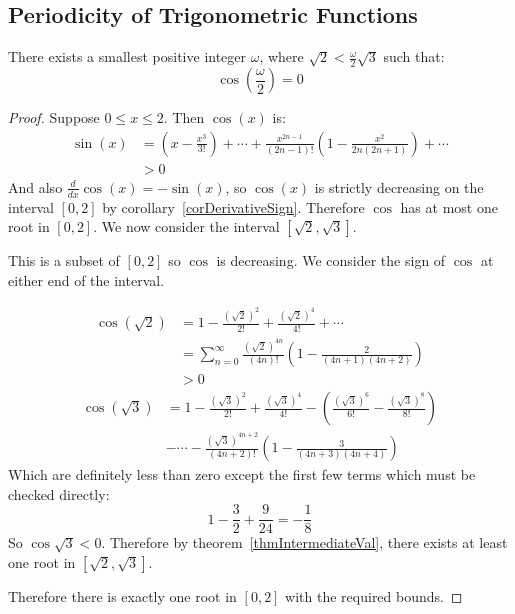 \documentclass[../Main.tex]{subfiles}
\begin{document}
\subsection{Periodicity of Trigonometric Functions}
\begin{lemma}
    There exists a smallest positive integer $\omega$, where $\sqrt{2} < \frac{\omega}{2} \sqrt{3}$ such that:
    \begin{equation*}
        \cos\left(\frac{\omega}{2}\right) = 0
    \end{equation*}
    \label{lemRootOfCos}
\end{lemma}
\begin{proof}
    Suppose $0 \leq x \leq 2$. Then $\cos(x)$ is:
    \begin{align*}
        \sin(x) &= \left(x - \frac{x^3}{3!}\right) + \cdots + \frac{x^{2n-1}}{(2n-1)!}\left(1 - \frac{x^2}{2n(2n+1)}\right) + \cdots \\
        &>0
    \end{align*}
    And also $\frac{d}{dx} \cos(x) = -\sin(x)$, so $\cos(x)$ is strictly decreasing on the interval $[0, 2]$ by corollary~\ref{corDerivativeSign}. Therefore $\cos$ has at most one root in $[0, 2]$. We now consider the interval $\left[\sqrt{2}, \sqrt{3}\right]$.\par
    This is a subset of $[0, 2]$ so $\cos$ is decreasing. We consider the sign of $\cos$ at either end of the interval.\par
    \begin{align*}
        \cos(\sqrt{2}) &= 1 - \frac{(\sqrt{2})^2}{2!} + \frac{(\sqrt{2})^4}{4!} + \cdots \\
        &= \sum_{n = 0}^\infty \frac{(\sqrt{2})^{4n}}{(4n)!}\left(1 - \frac{2}{(4n + 1)(4n + 2)}\right) \\
        &>0
    \end{align*}
    \begin{align*}
        \cos(\sqrt{3}) &= 1 - \frac{(\sqrt{3})^2}{2!} + \frac{(\sqrt{3})^4}{4!} - \left(\frac{(\sqrt{3})^6}{6!} - \frac{(\sqrt{3})^8}{8!}\right) \\
        &- \cdots - \frac{(\sqrt{3})^{4n+2}}{(4n+2)!}\left(1 - \frac{3}{(4n + 3)(4n + 4)}\right)
    \end{align*}
    Which are definitely less than zero except the first few terms which must be checked directly:
    \begin{equation*}
        1 - \frac{3}{2} + \frac{9}{24} = -\frac{1}{8}
    \end{equation*}
    So $\cos{\sqrt{3}} < 0$.
    Therefore by theorem~\ref{thmIntermediateVal}, there exists at least one root in $[\sqrt{2}, \sqrt{3}]$.\par
    Therefore there is exactly one root in $[0, 2]$ with the required bounds.
\end{proof}
\end{document}
